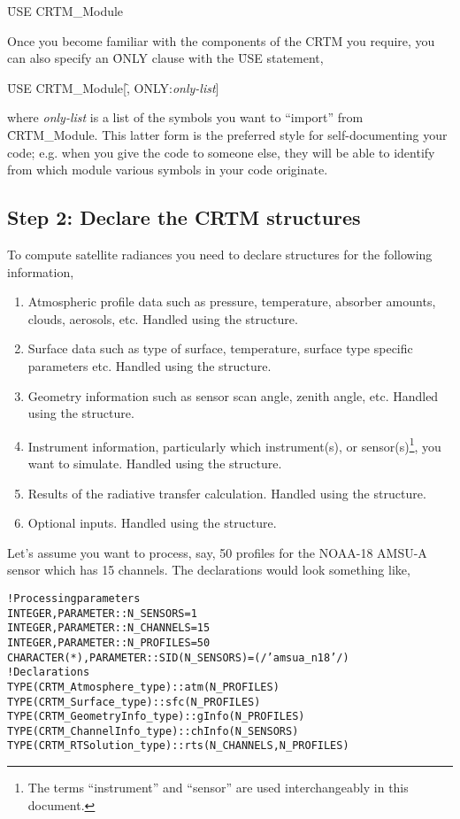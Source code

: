 \qquad\f{USE CRTM\_Module}

Once you become familiar with the components of the CRTM you require, you can also specify an \f{ONLY} clause with the \f{USE} statement,

\qquad\f{USE CRTM\_Module}[\f{, ONLY:}\textit{only-list}]

where \textit{only-list} is a list of the symbols you want to ``import'' from \f{CRTM\_Module}. This latter form is the preferred style for self-documenting your code; e.g. when you give the code to someone else, they will be able to identify from which module various symbols in your code originate.


\subsection{Step 2: Declare the CRTM structures}
\label{sec:declare_step}
To compute satellite radiances you need to declare structures for the following information,\vspace{-2ex}
\begin{enumerate}
  \item Atmospheric profile data such as pressure, temperature, absorber amounts, clouds, aerosols, etc. Handled using the \hyperref[sec:atmosphere_structure]{\Atmosphere} structure.
  \item Surface data such as type of surface, temperature, surface type specific parameters etc. Handled using the \hyperref[sec:surface_structure]{\Surface} structure.
  \item Geometry information such as sensor scan angle, zenith angle, etc. Handled using the \hyperref[sec:geometryinfo_structure]{\GeometryInfo} structure.
  \item Instrument information, particularly which instrument(s), or sensor(s)\footnote{The terms ``instrument'' and ``sensor'' are used interchangeably in this document.}, you want to simulate. Handled using the \hyperref[sec:channelinfo_structure]{\ChannelInfo} structure.
  \item Results of the radiative transfer calculation. Handled using the \hyperref[sec:rtsolution_structure]{\RTSolution} structure.
  \item Optional inputs. Handled using the \hyperref[sec:options_structure]{\Options} structure.
\end{enumerate}

Let's assume you want to process, say, 50 profiles for the NOAA-18 AMSU-A sensor which has 15 channels. The declarations would look something like,
\begin{alltt}
  ! Processing parameters
  INTEGER     , PARAMETER :: N_SENSORS  =  1
  INTEGER     , PARAMETER :: N_CHANNELS = 15
  INTEGER     , PARAMETER :: N_PROFILES = 50
  CHARACTER(*), PARAMETER :: SID(N_SENSORS) = (/'amsua_n18'/)
  ! Declarations
  TYPE(CRTM_Atmosphere_type)   :: atm(N_PROFILES)
  TYPE(CRTM_Surface_type)      :: sfc(N_PROFILES)
  TYPE(CRTM_GeometryInfo_type) :: gInfo(N_PROFILES)  
  TYPE(CRTM_ChannelInfo_type)  :: chInfo(N_SENSORS)  
  TYPE(CRTM_RTSolution_type)   :: rts(N_CHANNELS,N_PROFILES)\end{alltt}


